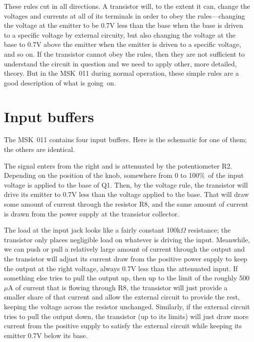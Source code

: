 These rules cut in all directions.  A transistor will, to the extent it can,
change the voltages and currents at all of its terminals in order to obey
the rules---changing the voltage at the emitter to be 0.7V less than the
base when the base is driven to a specific voltage by external circuity, but
also changing the voltage at the base to 0.7V above the emitter when the
emitter is driven to a specific voltage, and so on.  If the transistor
cannot obey the rules, then they are not sufficient to understand the
circuit in question and we need to apply other, more detailed, theory.  But
in the MSK~011 during normal operation, these simple rules are a good
description of what is going~on.

\pagebreak

\section{Input buffers}

The MSK~011 contains four input buffers.  Here is the schematic for one of
them; the others are identical.

{\centering\par}

The signal enters from the right and is attenuated by the potentiometer R2. 
Depending on the position of the knob, somewhere from 0 to 100\%\ of the
input voltage is applied to the base of Q1.  Then, by the voltage rule, the
transistor will drive its emitter to 0.7V less than the voltage applied to
the base.  That will draw some amount of current through the resistor R8,
and the same amount of current is drawn from the power supply at the
transistor collector.

The load at the input jack looks like a fairly constant 100k$\Omega$
resistance; the transistor only places negligible load on whatever is
driving the input.  Meanwhile, we can push or pull a relatively large amount
of current through the output and the transistor will adjust its current
draw from the positive power supply to keep the output at the right voltage,
always 0.7V less than the attenuated input.  If something else tries to pull
the output up, then up to the limit of the roughly 500$\mu$A of current that
is flowing through R8, the transistor will just provide a smaller share of
that current and allow the external circuit to provide the rest, keeping the
voltage across the resistor unchanged.  Similarly, if the external circuit
tries to pull the output down, the transistor (up to its limits) will just
draw more current from the positive supply to satisfy the external circuit
while keeping its emitter 0.7V below its base.

